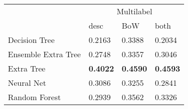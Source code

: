 \begin{tabular}{|l|l|l|l| }
\hline
 &  \multicolumn{3}{c|}{Multilabel} \\
\cline{2-4} & desc & BoW & both \\ \hline
Decision Tree       & 0.2163 & 0.3388 & 0.2034\\
Ensemble Extra Tree & 0.2748 & 0.3357 & 0.3046\\
Extra Tree          & {\bf 0.4022} & {\bf 0.4590} & {\bf 0.4593}\\
Neural Net          & 0.3086 & 0.3255 & 0.2841\\
Random Forest       & 0.2939 & 0.3562 & 0.3326\\
\hline
\end{tabular}